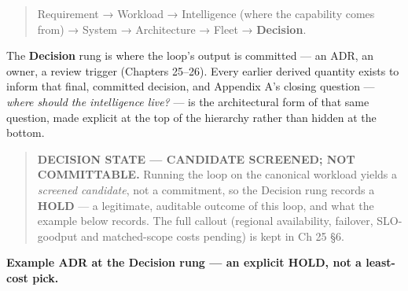 \begin{quote}
Requirement → Workload → Intelligence (where the capability comes from)
→ System → Architecture → Fleet → \textbf{Decision}.
\end{quote}

The \textbf{Decision} rung is where the loop's output is committed ---
an ADR, an owner, a review trigger (Chapters 25--26). Every earlier
derived quantity exists to inform that final, committed decision, and
Appendix A's closing question --- \emph{where should the intelligence
live?} --- is the architectural form of that same question, made
explicit at the top of the hierarchy rather than hidden at the bottom.

\begin{quote}
\textbf{DECISION STATE --- CANDIDATE SCREENED; NOT COMMITTABLE.} Running
the loop on the canonical workload yields a \emph{screened candidate},
not a commitment, so the Decision rung records a \textbf{HOLD} --- a
legitimate, auditable outcome of this loop, and what the example below
records. The full callout (regional availability, failover, SLO-goodput
and matched-scope costs pending) is kept in Ch 25 §6.
\end{quote}

\textbf{Example ADR at the Decision rung --- an explicit HOLD, not a
least-cost pick.}

